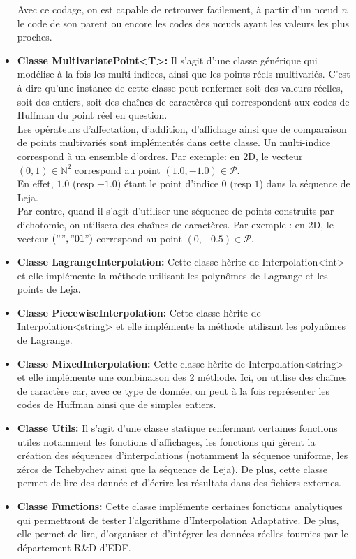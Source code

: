 \begin{itemize}
\begin{center}
\end{center}
Avec ce codage, on est capable de retrouver facilement, à partir d'un nœud $n$ le code de son parent ou encore les codes des nœuds ayant les valeurs les plus proches.\\

\item \textbf{Classe MultivariatePoint<T>:} Il s'agit d'une classe générique qui modélise à la fois les multi-indices, ainsi que les points réels multivariés.
C'est à dire qu'une instance de cette classe peut renfermer soit des valeurs réelles, soit des entiers, soit des chaînes de caractères qui correspondent aux codes de Huffman
du point réel en question.\\
Les opérateurs d'affectation, d'addition, d'affichage ainsi que de comparaison de points multivariés sont implémentés dans cette classe.
Un multi-indice correspond à un ensemble d'ordres. Par exemple: en 2D, le vecteur $(0,1) \in \mathbb{N}^2$ correspond au point $(1.0,-1.0) \in \mathcal{P}$. \\
En effet, $1.0$ (resp $-1.0$) étant le point d'indice $0$ (resp $1$) dans la séquence de Leja.\\
Par contre, quand il s'agit d'utiliser une séquence de points construits par dichotomie, on utilisera des chaînes de caractères. Par exemple : en 2D,
le vecteur $("","01")$ correspond au point $(0,-0.5) \in \mathcal{P}$.\\

\item \textbf{Classe LagrangeInterpolation:} Cette classe hèrite de Interpolation<int> et elle implémente la méthode utilisant les polynômes de Lagrange et les points de Leja.

\item \textbf{Classe PiecewiseInterpolation:} Cette classe hèrite de Interpolation<string> et elle implémente la méthode utilisant les polynômes de Lagrange.

\item \textbf{Classe MixedInterpolation:} Cette classe hèrite de Interpolation<string> et elle implémente une combinaison des 2 méthode. Ici, on utilise des chaînes de caractère
car, avec ce type de donnée, on peut à la fois représenter les codes de Huffman ainsi que de simples entiers.

\item \textbf{Classe Utils:} Il s'agit d'une classe statique renfermant certaines fonctions utiles notamment les fonctions d'affichages,
les fonctions qui gèrent la création des séquences d'interpolations (notamment la séquence uniforme, les zéros de Tchebychev ainsi que la séquence de Leja).
De plus, cette classe permet de lire des donnée et d'écrire les résultats dans des fichiers externes.

\item \textbf{Classe Functions:}
Cette classe implémente certaines fonctions analytiques qui permettront de tester l'algorithme d'Interpolation Adaptative. De plus, elle permet de lire, d'organiser
et d'intégrer les données réelles fournies par le département R\&D d'EDF.
\end{itemize}


